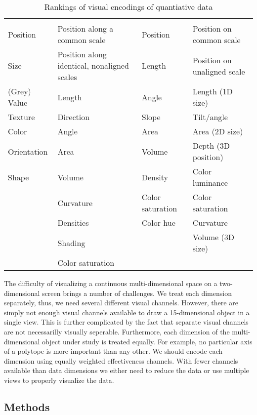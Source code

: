 \begin{table}
  \caption{Rankings of visual encodings of quantiative data}
  \label{tbl:visual_encodings}
  \begin{tabular}{llll}
    \cite{Bertin:1967} & \cite{Cleveland:1984} & \cite{Mackinlay:1986} & \cite{Munzner:2014} \\
     Position & Position along a common scale & Position & Position on common scale \\
     Size & Position along identical, nonaligned scales & Length & Position on unaligned scale \\
     (Grey) Value & Length & Angle & Length (1D size) \\
     Texture & Direction & Slope & Tilt/angle \\
     Color & Angle & Area & Area (2D size) \\
     Orientation & Area & Volume & Depth (3D position) \\
     Shape & Volume & Density & Color luminance\\
     & Curvature & Color saturation & Color saturation \\
     & Densities & Color hue & Curvature \\
     & Shading & & Volume (3D size) \\
     & Color saturation &           & 
  \end{tabular}
\end{table}

The difficulty of visualizing a continuous multi-dimensional space on a
two-dimensional screen brings a number of challenges. We treat each dimension
separately, thus, we need several different visual channels. However, there are
simply not enough visual channels available to draw a 15-dimensional object in
a single view. This is further complicated by the fact that separate visual
channels are not necessarilly visually seperable.  Furthermore, each dimension
of the multi-dimensional object under study is treated equally. For example, no
particular axis of a polytope is more important than any other.  We should
encode each dimension using equally weighted effectiveness channels.  With
fewer channels available than data dimensions we either need to reduce the data
or use multiple views to properly visualize the data.


\subsection{Methods}

